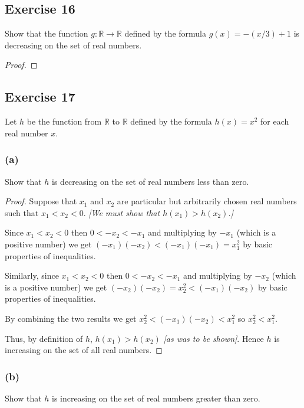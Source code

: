 \documentclass[14pt]{extarticle}
\newcommand{\R}{\mathbb{R}}
\begin{document}
\subsection{Exercise 16}
Show that the function \(g: \R \to \R\) defined by the formula \(g(x) = -(x/3) + 1\) is decreasing on the set of real
numbers.

\begin{proof}

\end{proof}

\subsection{Exercise 17}
Let \(h\) be the function from \(\R\) to \(\R\) defined by the formula \(h(x) = x^2\) for each real number \(x\).

\subsubsection{(a)}
Show that \(h\) is decreasing on the set of real numbers less than zero.

\begin{proof}
    Suppose that \(x_1\) and \(x_2\) are particular but arbitrarily chosen real numbers such that \(x_1 < x_2 < 0\).
        {\it [We must show that \(h(x_1) > h(x_2)\).]}

    Since \(x_1 < x_2 < 0\) then \(0 < -x_2 < -x_1\) and multiplying by \(-x_1\) (which is a positive number) we get
    \((-x_1)(-x_2) < (-x_1)(-x_1) = x_1^2\) by basic properties of inequalities.

    Similarly, since \(x_1 < x_2 < 0\) then \(0 < -x_2 < -x_1\) and multiplying by \(-x_2\) (which is a positive number) we
    get \((-x_2)(-x_2) = x_2^2 < (-x_1)(-x_2)\) by basic properties of inequalities.

    By combining the two results we get \(x_2^2 < (-x_1)(-x_2) < x_1^2\) so \(x_2^2 < x_1^2\).

    Thus, by definition of \(h\), \(h(x_1) > h(x_2)\) {\it [as was to be shown]}. Hence \(h\) is increasing on the set of all
    real numbers.
\end{proof}

\subsubsection{(b)}
Show that \(h\) is increasing on the set of real numbers greater than zero.
\end{document}
